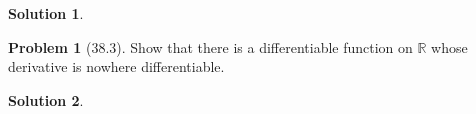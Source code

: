 \documentclass[12pt]{article}
\theoremstyle{definition} %
\newtheorem{solution}{Solution}
\newtheorem{problem}{Problem}
\theoremstyle{plain} %
\begin{document}
\begin{solution}
    
\end{solution}
\begin{problem}[38.3]
Show that there is a differentiable function on $\mathbb{R}$ whose derivative is nowhere differentiable.
\end{problem}
\begin{solution}
    
\end{solution}
\end{document}
